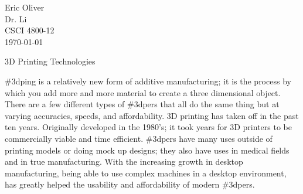 \documentclass[12pt]{article}
\begin{document}
\begin{flushleft}

Eric Oliver \\
Dr. Li \\
CSCI 4800-12 \\
\today

\begin{center}
\large 3D Printing Technologies
\end{center}

\setlength{\parindent}{0.5in}



\#3dping is a relatively new form of additive manufacturing; it is the process by which you add more and more material to create a three dimensional object. There are a few different types of \#3dpers that all do the same thing but at varying accuracies, speeds, and affordability. 3D printing has taken off in the past ten years. Originally developed in the 1980's; it took years for 3D printers to be commercially viable and time efficient. \#3dpers have many uses outside of printing models or doing mock up designs; they also have uses in medical fields and in true manufacturing. With the increasing growth in desktop manufacturing, being able to use complex machines in a desktop environment, has greatly helped the usability and affordability of modern \#3dpers. 


\end{flushleft}
\end{document}
